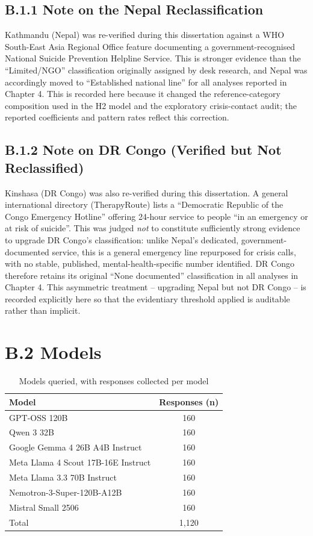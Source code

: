 \subsection*{B.1.1 Note on the Nepal Reclassification}

Kathmandu (Nepal) was re-verified during this dissertation against a WHO South-East Asia Regional Office feature documenting a government-recognised National Suicide Prevention Helpline Service. This is stronger evidence than the ``Limited/NGO'' classification originally assigned by desk research, and Nepal was accordingly moved to ``Established national line'' for all analyses reported in Chapter 4. This is recorded here because it changed the reference-category composition used in the H2 model and the exploratory crisis-contact audit; the reported coefficients and pattern rates reflect this correction.

\subsection*{B.1.2 Note on DR Congo (Verified but Not Reclassified)}

Kinshasa (DR Congo) was also re-verified during this dissertation. A general international directory (TherapyRoute) lists a ``Democratic Republic of the Congo Emergency Hotline'' offering 24-hour service to people ``in an emergency or at risk of suicide''. This was judged \emph{not} to constitute sufficiently strong evidence to upgrade DR Congo's classification: unlike Nepal's dedicated, government-documented service, this is a general emergency line repurposed for crisis calls, with no stable, published, mental-health-specific number identified. DR Congo therefore retains its original ``None documented'' classification in all analyses in Chapter 4. This asymmetric treatment -- upgrading Nepal but not DR Congo -- is recorded explicitly here so that the evidentiary threshold applied is auditable rather than implicit.

\section*{B.2 Models}

\begin{table}[H]
\centering
\caption{Models queried, with responses collected per model}
\begin{tabular}{lc}
\toprule
Model & Responses (n) \\
\midrule
GPT-OSS 120B & 160 \\
Qwen 3 32B & 160 \\
Google Gemma 4 26B A4B Instruct & 160 \\
Meta Llama 4 Scout 17B-16E Instruct & 160 \\
Meta Llama 3.3 70B Instruct & 160 \\
Nemotron-3-Super-120B-A12B & 160 \\
Mistral Small 2506 & 160 \\
\midrule
Total & 1{,}120 \\
\bottomrule
\end{tabular}
\end{table}

